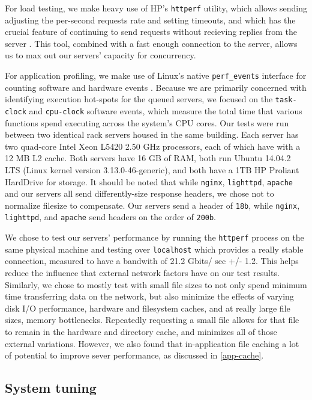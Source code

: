 \documentclass[twoside,10pt]{article}
\begin{document}
\begin{multicols}{2}
For load testing, we make heavy use of HP's \verb+httperf+ utility,
which allows sending adjusting the per-second requests rate and
setting timeouts, and which has the crucial feature of continuing to
send requests without recieving replies from the server
\cite{mosberger1998httperf}. This tool, combined with a fast enough
connection to the server, allows us to max out our servers' capacity
for concurrency.

For application profiling, we make use of Linux's native
\verb+perf_events+ interface for counting software and hardware events
\cite{weaver2013linux}. Because we are primarily concerned with
identifying execution hot-spots for the queued servers, we focused on
the \verb+task-clock+ and \verb+cpu-clock+ software events, which
measure the total time that various functions spend executing across
the system's CPU cores. 
Our tests were run between two identical rack servers housed in the
same building. Each server has two quad-core Intel Xeon L5420 2.50 GHz
processors, each of which have with a 12 MB L2 cache. Both servers
have 16 GB of RAM, both run Ubuntu 14.04.2 LTS (Linux kernel version
3.13.0-46-generic), and both have a 1TB HP Proliant HardDrive for
storage.
It should be noted that while \verb+nginx+, \verb+lighttpd+,
\verb+apache+ and our servers all send differently-size response
headers, we chose not to normalize filesize to compensate. Our servers
send a header of \verb+18b+, while \verb+nginx+, \verb+lighttpd+, and
\verb+apache+ send headers on the order of \verb+200b+.

We chose to test our servers' performance by running the \verb+httperf+
process on the same physical machine and testing over \verb+localhost+ which
provides a really stable connection, measured to have a bandwith of 21.2 Gbits/
sec +/- 1.2. This helps reduce the influence that external network factors have on our test results. Similarly, we chose to mostly test with small file sizes to not only spend minimum time transferring data on the network, but 
also minimize the effects of varying disk I/O performance, hardware and filesystem caches, and at really large file sizes, memory bottlenecks. Repeatedly requesting a small file allows for that file to remain in the hardware and directory cache, and minimizes all of those external variations. However, we also found that in-application file caching a lot of potential 
to improve sever performance, as discussed in \ref{app-cache}. 

\subsection{System tuning}


\end{multicols}
\end{document}
